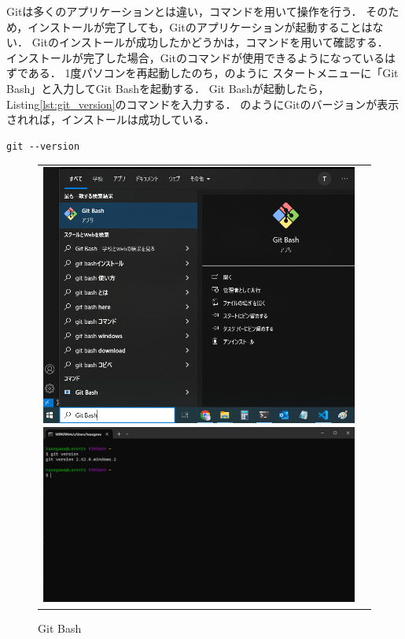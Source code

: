 Gitは多くのアプリケーションとは違い，コマンドを用いて操作を行う．
そのため，インストールが完了しても，Gitのアプリケーションが起動することはない．
Gitのインストールが成功したかどうかは，コマンドを用いて確認する．
インストールが完了した場合，Gitのコマンドが使用できるようになっているはずである．
1度パソコンを再起動したのち，のように
スタートメニューに「Git Bash」と入力してGit Bashを起動する．
Git Bashが起動したら，Listing\ref{lst:git_version}のコマンドを入力する．
のようにGitのバージョンが表示されれば，インストールは成功している．

\begin{lstlisting}[caption=Gitのバージョン確認コマンド, label=lst:git_version]
  git --version
\end{lstlisting}

\begin{figure}[h]
  \begin{tabular}{cc}
      \begin{minipage}{.5\textwidth}
          \centering
          \includegraphics[width=1.0\linewidth]{figure/appendix/git_bash.png}
          \caption{Git Bash}
          \label{fig:git_bash} %
      \end{minipage}
      \begin{minipage}{.5\textwidth}
          \centering
          \includegraphics[width=1.0\linewidth]{figure/appendix/git_version.png}

\end{minipage}
\end{tabular}
\end{figure}
